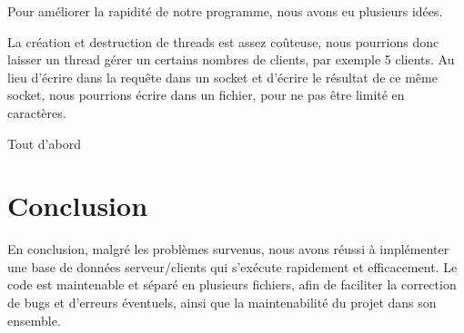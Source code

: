 \documentclass[utf8]{article}
\begin{document}
Pour améliorer la rapidité de notre programme, nous avons eu plusieurs idées.

La création et destruction de threads est assez coûteuse, nous pourrions donc laisser un thread gérer un certains nombres de clients, par exemple 5 clients.
Au lieu d'écrire dans la requête dans un socket et d'écrire le résultat de ce même socket, nous pourrions écrire dans un fichier, pour ne pas être limité en caractères.

Tout d'abord
\section{Conclusion}
En conclusion, malgré les problèmes survenus, nous avons réussi à implémenter une base de données serveur/clients qui s'exécute rapidement et efficacement.\newline
Le code est maintenable et séparé en plusieurs fichiers, afin de faciliter la correction de bugs et d'erreurs éventuels, ainsi que la maintenabilité du projet dans son ensemble.
\end{document}
